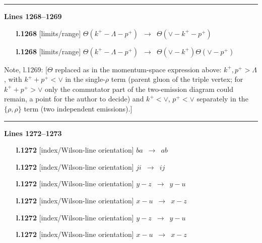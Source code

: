 \documentclass[10pt]{article}
\newenvironment{notebox}{\def\FrameCommand{{\color{notebar}\vrule width 1.5pt}\hspace{6pt}}\MakeFramed{\advance\hsize-\width\FrameRestore}\small}{\endMakeFramed}
\begin{document}
\noindent\rule{\linewidth}{0.3pt}\par\noindent\textbf{Lines 1268--1269} \par
\begin{itemize}[leftmargin=2.2em,itemsep=1pt,topsep=2pt]
\item[\textbf{l.1268}] \textsf{\small [limits/range]} $\displaystyle \Theta(k^{+}-\Lambda-p^{+})$\ $\longrightarrow$\ $\displaystyle \Theta(\vee-k^{+}-p^{+})$
\item[\textbf{l.1268}] \textsf{\small [limits/range]} $\displaystyle \Theta(k^{+}-\Lambda-p^{+})$\ $\longrightarrow$\ $\displaystyle \Theta(\vee-k^{+})\Theta(\vee-p^{+})$
\end{itemize}
\begin{notebox}\textsf{\small Note, l.1269:} [$\Theta$ replaced as in the momentum-space expression above: $k^+,p^+>\Lambda$, with $k^++p^+<\vee$ in the single-$\rho$ term (parent gluon of the triple vertex; for $k^++p^+>\vee$ only the commutator part of the two-emission diagram could remain, a point for the author to decide) and $k^+<\vee$, $p^+<\vee$ separately in the $\{\rho,\rho\}$ term (two independent emissions).]\end{notebox}
\noindent\rule{\linewidth}{0.3pt}\par\noindent\textbf{Lines 1272--1273} \par
\begin{itemize}[leftmargin=2.2em,itemsep=1pt,topsep=2pt]
\item[\textbf{l.1272}] \textsf{\small [index/Wilson-line orientation]} $\displaystyle ba$\ $\longrightarrow$\ $\displaystyle ab$
\item[\textbf{l.1272}] \textsf{\small [index/Wilson-line orientation]} $\displaystyle ji$\ $\longrightarrow$\ $\displaystyle ij$
\item[\textbf{l.1272}] \textsf{\small [index/Wilson-line orientation]} $\displaystyle y-z$\ $\longrightarrow$\ $\displaystyle y-u$
\item[\textbf{l.1272}] \textsf{\small [index/Wilson-line orientation]} $\displaystyle x-u$\ $\longrightarrow$\ $\displaystyle x-z$
\item[\textbf{l.1272}] \textsf{\small [index/Wilson-line orientation]} $\displaystyle y-z$\ $\longrightarrow$\ $\displaystyle y-u$
\item[\textbf{l.1272}] \textsf{\small [index/Wilson-line orientation]} $\displaystyle x-u$\ $\longrightarrow$\ $\displaystyle x-z$
\end{itemize}
\end{document}
